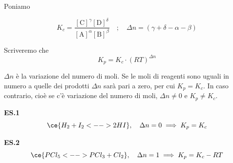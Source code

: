 Poniamo

$$K_c = \frac{[\text{C}]^{\gamma} [\text{D}]^{\delta}}{[\text{A}]^{\alpha} [\text{B}]^{\beta}}
\quad;\quad
\Delta n= (\gamma + \delta - \alpha - \beta)$$

Scriveremo che
$$K_p = K_c \cdot (RT)^{\Delta n}$$

$\Delta n$ è la variazione del numero di moli. Se le moli di reagenti sono uguali in numero a quelle dei prodotti $\Delta n$ sarà pari a zero, per cui $K_p = K_c$. In caso contrario, cioè se c'è variazione del numero di moli, $\Delta n \neq 0$ e $K_p \neq K_c$.

\vspace{0.2cm}\textbf{ES.1}
$$\ce{H_2 + I_2 <--> 2HI}, \quad \Delta n = 0 \implies K_p = K_c$$

\textbf{ES.2}
$$\ce{PCl_5  <--> PCl_3 + Cl_2}, \quad \Delta n = 1 \implies K_p = K_c - RT$$
